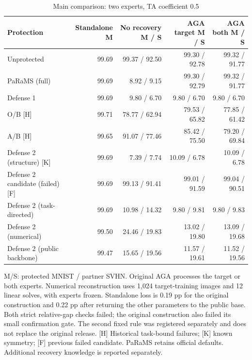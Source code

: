 \begin{table}[!htbp]
\centering
\small
\caption{Main comparison: two experts, TA coefficient 0.5}
\label{tab:main}
\begin{tabular}{lrrrr}
\toprule
Protection & Standalone M & No recovery M / S & AGA target M / S & AGA both M / S \\
\midrule
Unprotected & 99.69 & 99.37 / 92.50 & 99.30 / 92.78 & 99.32 / 91.77 \\
PaRaMS (full) & 99.69 & 8.92 / 9.15 & 99.30 / 92.79 & 99.32 / 91.77 \\
Defense 1 & 99.69 & 9.80 / 6.70 & 9.80 / 6.70 & 9.80 / 6.70 \\
O/B [H] & 99.71 & 78.77 / 62.94 & 79.53 / 65.82 & 77.85 / 61.42 \\
A/B [H] & 99.65 & 91.07 / 77.46 & 85.42 / 75.50 & 79.20 / 69.84 \\
Defense 2 (structure) [K] & 99.69 & 7.39 / 7.74 & 10.09 / 6.78 & 10.09 / 6.78 \\
Defense 2 candidate (failed) [F] & 99.69 & 99.13 / 91.41 & 99.01 / 91.59 & 99.04 / 90.51 \\
Defense 2 (task-directed) & 99.69 & 10.98 / 14.32 & 9.80 / 9.81 & 9.80 / 9.83 \\
Defense 2 (numerical) & 99.50 & 24.46 / 19.83 & 13.02 / 19.80 & 13.09 / 19.68 \\
Defense 2 (public backbone) & 99.47 & 15.65 / 19.56 & 11.57 / 19.61 & 11.52 / 19.56 \\
\bottomrule
\end{tabular}
\par\vspace{3pt}\begin{minipage}{0.98\linewidth}\footnotesize M/S: protected MNIST / partner SVHN. Original AGA processes the target or both experts. Numerical reconstruction uses 1,024 target-training images and 12 linear solves, with experts frozen. Standalone loss is 0.19 pp for the original construction and 0.22 pp after returning the other parameters to the public base. Both strict relative-gap checks failed; the original construction also failed its small confirmation gate. The second fixed rule was registered separately and does not replace the original release. [H] Historical task-bound failures; [K] known symmetry; [F] previous failed candidate. PaRaMS retains official defaults. Additional recovery knowledge is reported separately.\end{minipage}
\end{table}

